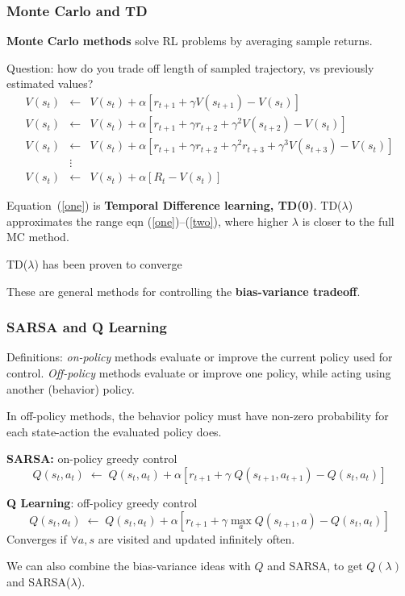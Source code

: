\begin{frame}
\frametitle{Monte Carlo and TD}

{\bf Monte Carlo methods} solve RL problems by averaging sample returns.

Question: how do you trade off length of sampled trajectory, vs
previously estimated values?
\begin{eqnarray}
V(s_t) &\leftarrow &V(s_t) + \alpha [ r_{t+1} + \gamma V(s_{t+1}) -
V(s_{t})] \label{one} \\
V(s_t) &\leftarrow &V(s_t) + \alpha [ r_{t+1} + \gamma r_{t+2} +
\gamma^2 V(s_{t+2}) -
V(s_{t})] \nonumber \\
V(s_t) &\leftarrow &V(s_t) + \alpha [ r_{t+1} + \gamma r_{t+2} +
\gamma^2 r_{t+3} + \gamma^3 V(s_{t+3}) -
V(s_{t})] \nonumber \\
& \vdots& \nonumber \\
V(s_t) &\leftarrow &V(s_t) + \alpha [ R_t - V(s_{t})]  \label{two}
\end{eqnarray}

Equation~(\ref{one}) is {\bf Temporal Difference learning,
TD(0)}. TD($\lambda$) approximates the range eqn
(\ref{one})--(\ref{two}), where higher $\lambda$ is closer to the full
MC method.

TD($\lambda$) has been proven to converge

These are general methods for controlling the {\bf bias-variance tradeoff}.
\end{frame}

\begin{frame}
\frametitle{SARSA and Q Learning}

Definitions: {\em on-policy} methods evaluate or improve the
current policy used for control. {\em Off-policy} methods evaluate or improve
one policy, while acting using another (behavior) policy.

In off-policy methods, the behavior policy must have non-zero
probability for each state-action the evaluated policy does.


{\bf SARSA:} on-policy greedy control
\[
Q(s_t,a_t)\;\leftarrow\;Q(s_t,a_t) + \alpha [ r_{t+1} + \gamma 
\; Q(s_{t+1},a_{t+1}) - Q(s_t,a_t) ]
\]

{\bf Q Learning}: off-policy greedy control
\[
Q(s_t,a_t)\;\leftarrow\;Q(s_t,a_t) + \alpha [ r_{t+1} + \gamma \max_a
Q(s_{t+1},a) - Q(s_t,a_t) ]
\]
Converges if $\forall a,s$ are visited and updated infinitely often.

We can also combine the bias-variance ideas with $Q$ and SARSA, to get
$Q(\lambda)$ and SARSA($\lambda$).
\end{frame}

